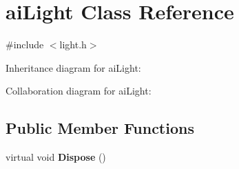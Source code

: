 \hypertarget{structai_light}{\section{ai\+Light Class Reference}
\label{structai_light}
}


{\ttfamily \#include $<$light.\+h$>$}



Inheritance diagram for ai\+Light\+:


Collaboration diagram for ai\+Light\+:
\subsection*{Public Member Functions}
\begin{DoxyCompactItemize}
\item 
\hypertarget{structai_light_a0f7fbaefb865687ff87a868526c4df01}{virtual void {\bfseries Dispose} ()}\label{structai_light_a0f7fbaefb865687ff87a868526c4df01}

\end{DoxyCompactItemize}

